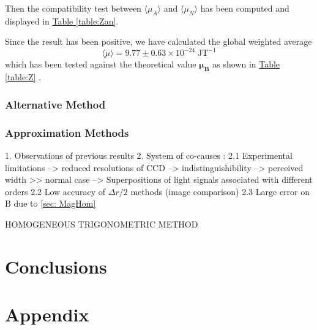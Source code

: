 \documentclass[a4paper,12pt,abstracton]{scrartcl}
\begin{document}
Then the compatibility test between $\langle \mu_A \rangle$ and $\langle \mu_N \rangle$ has been computed and displayed in \hyperref[table:Zan]{Table \ref*{table:Zan}}. 
\begin{table}[H]
\caption{}
\centering
{}
\label{table:Zan}
\end{table}

Since the result has been positive, we have calculated the global weighted average $$ \langle \mu\rangle=9.77 \pm  0.63\times 10^{-24}\;\text{JT}^{-1}$$ which has been tested against the theoretical value $\boldsymbol{\mu_B}$ as shown in \hyperref[table:Z]{Table \ref*{table:Z}} .

\begin{table}[H]
\caption{}
\centering
{}
\label{table:Z}
\end{table}


\subsubsection{Alternative Method}
 \subsubsection{Approximation Methods}
1. Observations of previous results 
2. System of co-causes : 
   2.1 Experimental limitations --> reduced resolutions of CCD --> indistinguishibility --> perceived width >> normal case --> Superpositions of light signals associated with different orders
   2.2 Low accuracy of $\Delta r /2$ methods (image comparison) 
   2.3 Large error on B due to \ref{sec: MagHom} 

   HOMOGENEOUS TRIGONOMETRIC METHOD 


\clearpage


\section{Conclusions}

\section{Appendix}

%
%
\end{document}
